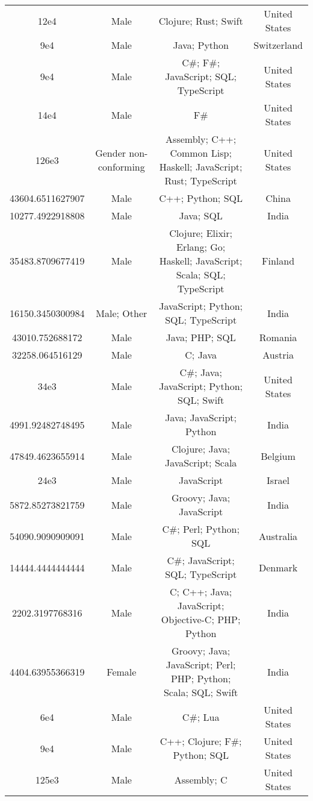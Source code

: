 \begin{center}
\begin{tabular}{ |c|c|c|c| }
12e4  &  Male  &  Clojure; Rust; Swift  &  United States  \\ 
9e4  &  Male  &  Java; Python  &  Switzerland  \\ 
9e4  &  Male  &  C\#; F\#; JavaScript; SQL; TypeScript  &  United States  \\ 
14e4  &  Male  &  F\#  &  United States  \\ 
126e3  &  Gender non-conforming  &  Assembly; C++; Common Lisp; Haskell; JavaScript; Rust; TypeScript  &  United States  \\ 
43604.6511627907  &  Male  &  C++; Python; SQL  &  China  \\ 
10277.4922918808  &  Male  &  Java; SQL  &  India  \\ 
35483.8709677419  &  Male  &  Clojure; Elixir; Erlang; Go; Haskell; JavaScript; Scala; SQL; TypeScript  &  Finland  \\ 
16150.3450300984  &  Male; Other  &  JavaScript; Python; SQL; TypeScript  &  India  \\ 
43010.752688172  &  Male  &  Java; PHP; SQL  &  Romania  \\ 
32258.064516129  &  Male  &  C; Java  &  Austria  \\ 
34e3  &  Male  &  C\#; Java; JavaScript; Python; SQL; Swift  &  United States  \\ 
4991.92482748495  &  Male  &  Java; JavaScript; Python  &  India  \\ 
47849.4623655914  &  Male  &  Clojure; Java; JavaScript; Scala  &  Belgium  \\ 
24e3  &  Male  &  JavaScript  &  Israel  \\ 
5872.85273821759  &  Male  &  Groovy; Java; JavaScript  &  India  \\ 
54090.9090909091  &  Male  &  C\#; Perl; Python; SQL  &  Australia  \\ 
14444.4444444444  &  Male  &  C\#; JavaScript; SQL; TypeScript  &  Denmark  \\ 
2202.3197768316  &  Male  &  C; C++; Java; JavaScript; Objective-C; PHP; Python  &  India  \\ 
4404.63955366319  &  Female  &  Groovy; Java; JavaScript; Perl; PHP; Python; Scala; SQL; Swift  &  India  \\ 
6e4  &  Male  &  C\#; Lua  &  United States  \\ 
9e4  &  Male  &  C++; Clojure; F\#; Python; SQL  &  United States  \\ 
125e3  &  Male  &  Assembly; C  &  United States  \\ 

\end{tabular}
\end{center}
